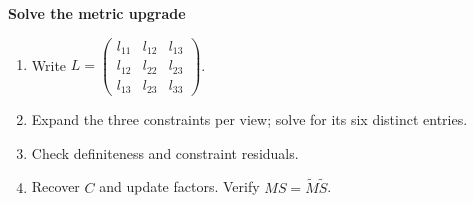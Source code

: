 \documentclass[letterpaper,11pt,english,openany,oneside]{jupyterBook}
\begin{document}
\begin{TextbookBox}
\textbf{Solve the metric upgrade}\par\smallskip
\begin{enumerate}
%
\item {}
\sphinxAtStartPar
Write \(L=\left(\begin{smallmatrix}l_{11}&l_{12}&l_{13}\\l_{12}&l_{22}&l_{23}\\l_{13}&l_{23}&l_{33}\end{smallmatrix}\right)\).

\item {}
\sphinxAtStartPar
Expand the three constraints per view; solve for its six distinct entries.

\item {}
\sphinxAtStartPar
Check definiteness and constraint residuals.

\item {}
\sphinxAtStartPar
Recover \(C\) and update  factors. Verify \(MS=\widetilde M\widetilde S\).

\end{enumerate}

\end{TextbookBox}
\label{\detokenize{lectures/lecture06/factorization:ex-lec06-upgrade}}
\end{document}
